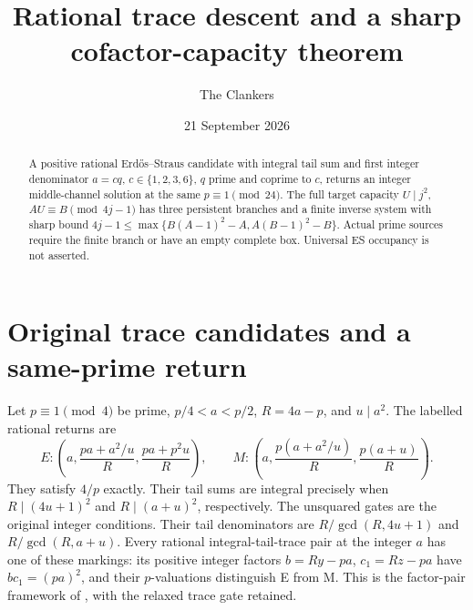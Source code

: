 \documentclass[10pt,reqno]{amsart}
\title[Trace descent and cofactor capacity]{Rational trace descent and a sharp cofactor-capacity theorem}
\author{The Clankers}\date{21 September 2026}
\begin{document}
\begin{abstract}
A positive rational Erd\H{o}s--Straus candidate with integral tail sum and first
integer denominator $a=cq$, $c\in\{1,2,3,6\}$, $q$ prime and coprime to $c$,
returns an integer middle-channel solution at the same $p\equiv1\pmod{24}$.
The full target capacity $U\mid j^2$, $AU\equiv B\pmod{4j-1}$ has three persistent
branches and a finite inverse system with sharp bound
$4j-1\le\max\{B(A-1)^2-A,A(B-1)^2-B\}$. Actual prime sources require the finite
branch or have an empty complete box. Universal ES occupancy is not asserted.
\end{abstract}\maketitle

\section{Original trace candidates and a same-prime return}
Let $p\equiv1\pmod4$ be prime, $p/4<a<p/2$, $R=4a-p$, and $u\mid a^2$.
The labelled rational returns are
\[
 E:\left(a,\frac{pa+a^2/u}{R},\frac{pa+p^2u}{R}\right),\qquad
 M:\left(a,\frac{p(a+a^2/u)}R,\frac{p(a+u)}R\right).
\]
They satisfy $4/p$ exactly. Their tail sums are integral precisely when
$R\mid(4u+1)^2$ and $R\mid(a+u)^2$, respectively. The unsquared gates are the
original integer conditions. Their tail denominators are
$R/\gcd(R,4u+1)$ and $R/\gcd(R,a+u)$.
Every rational integral-tail-trace pair at the integer $a$ has one of these
markings: its positive integer factors $b=Ry-pa$, $c_1=Rz-pa$ have
$bc_1=(pa)^2$, and their $p$-valuations distinguish E from M. This is the
factor-pair framework of \cite[\S2]{ET}, with the relaxed trace gate retained.
\end{document}
